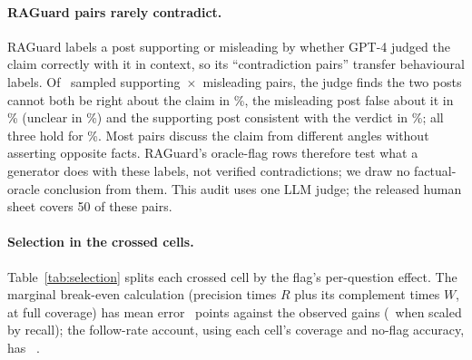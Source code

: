 \paragraph{RAGuard pairs rarely contradict.} RAGuard labels a post supporting or misleading by whether GPT-4 judged the claim correctly
with it in context, so its ``contradiction pairs'' transfer behavioural labels. Of \rgAudN\ sampled
supporting~$\times$~misleading pairs, the judge finds the two posts cannot both be right about the claim in
\rgAudContradict\%, the misleading post false about it in \rgAudBFalse\% (unclear in
\rgAudBUnclear\%) and the supporting post consistent with the verdict in \rgAudASupports\%; all three hold for
\rgAudVerified\%. Most pairs discuss the claim from different angles without asserting opposite
facts. RAGuard's oracle-flag rows therefore test what a generator does with these labels, not verified
contradictions; we draw no factual-oracle conclusion from them. This audit uses one LLM judge; the released
human sheet covers 50 of these pairs.


\paragraph{Selection in the crossed cells.} Table~\ref{tab:selection} splits each crossed cell by the flag's
per-question effect. The marginal break-even calculation (precision times $R$ plus its complement times $W$, at full
coverage) has mean error \selMargMae\ points against the observed gains (\selMargCovMae\ when scaled by recall); the
follow-rate account, using each cell's coverage and no-flag accuracy, has \predEightMae\ \predEightMaeCI.

